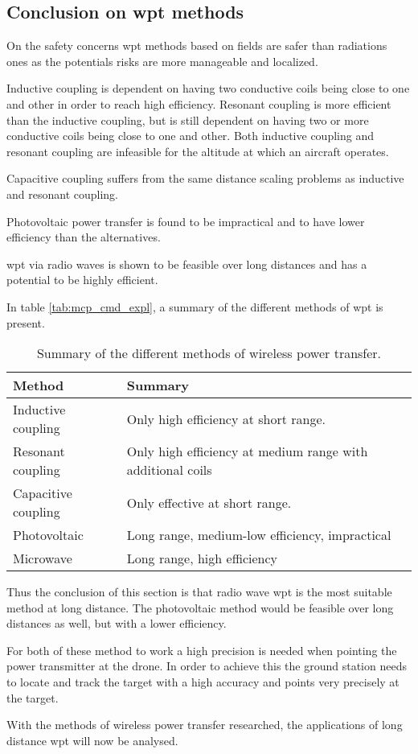 \subsection{Conclusion on \gls{wpt} methods}\label{sec:ConclusionWPT}
On the safety concerns \gls{wpt} methods based on fields are safer than radiations ones as the potentials risks are more manageable and localized.

Inductive coupling is dependent on having two conductive coils being close to one and other in order to reach high efficiency. Resonant coupling is more efficient than the inductive coupling, but is still dependent on having two or more conductive coils being close to one and other. Both inductive coupling and resonant coupling are infeasible for the altitude at which an aircraft operates. 

Capacitive coupling suffers from the same distance scaling problems as inductive and resonant coupling. 

Photovoltaic power transfer is found to be impractical and to have lower efficiency than the alternatives.

\gls{wpt} via radio waves is shown to be feasible over long distances and has a potential to be highly efficient.

In table \ref{tab:mcp_cmd_expl}, a summary of the different methods of \gls{wpt} is present.
\begin{table}[h]
	\centering
	\caption{Summary of the different methods of wireless power transfer.}

	\begin{tabularx}{\textwidth}{lXX}
		Method 				& Summary 										\\ \toprule \rowcolor{lightGrey}
		Inductive coupling	& Only high efficiency at short range. 	\\
		Resonant coupling	& Only high efficiency at medium range with additional coils	\\ \rowcolor{lightGrey}
		Capacitive coupling 		& Only effective at short range. \\
		Photovoltaic 		& Long range, medium-low efficiency, impractical \\\rowcolor{lightGrey}
		Microwave			& Long range, high efficiency \\ 
	\end{tabularx}
\end{table}\label{tab:mcp_cmd_expl}

Thus the conclusion of this section is that radio wave \gls{wpt} is the most suitable method at long distance. The photovoltaic method would be feasible over long distances as well, but with a lower efficiency. 

For both of these method to work a high precision is needed when pointing the power transmitter at the drone. In order to achieve this the ground station needs to locate and track the target with a high accuracy and points very precisely at the target. 

With the methods of wireless power transfer researched, the applications of long distance \gls{wpt} will now be analysed. 